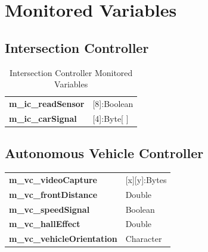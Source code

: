 \documentclass [10pt]{article}
\begin{document}
%




\section{Monitored Variables}

\subsection{Intersection Controller}

\begin{longtable}{ |p{ }  p{ }|}\caption{Intersection Controller Monitored Variables}   \hline
\textbf{m\_ic\_readSensor} & [8]:Boolean  \\

\cellcolor{tableCell}\textbf{m\_ic\_carSignal}  & \cellcolor{tableCell}[4]:Byte[ ] \\  \hline
\end{longtable}

\subsection{Autonomous Vehicle Controller}

\begin{longtable}{ |p{ }  p{ }|}  \hline
\textbf{m\_vc\_videoCapture} & [x][y]:Bytes  \\ 

\cellcolor{tableCell}\textbf{m\_vc\_frontDistance}  & \cellcolor{tableCell}Double \\ 


\textbf{m\_vc\_speedSignal} & Boolean \\

\cellcolor{tableCell}\textbf{m\_vc\_hallEffect}  & \cellcolor{tableCell}Double \\ 

\textbf{m\_vc\_vehicleOrientation} & Character \\\hline
\end{longtable}


\end{document}
